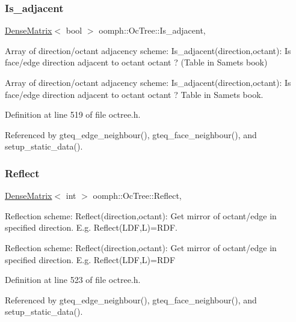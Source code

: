 \subsubsection{\texorpdfstring{Is\+\_\+adjacent}{Is\_adjacent}}
{\footnotesize\ttfamily \hyperlink{classoomph_1_1DenseMatrix}{Dense\+Matrix}$<$ bool $>$ oomph\+::\+Oc\+Tree\+::\+Is\+\_\+adjacent\hspace{0.3cm}{\ttfamily [static]}, {\ttfamily [private]}}



Array of direction/octant adjacency scheme\+: Is\+\_\+adjacent(direction,octant)\+: Is face/edge {\ttfamily direction} adjacent to octant {\ttfamily octant} ? (Table in Samet\textquotesingle{}s book) 

Array of direction/octant adjacency scheme\+: Is\+\_\+adjacent(direction,octant)\+: Is face/edge {\ttfamily direction} adjacent to octant {\ttfamily octant} ? Table in Samet\textquotesingle{}s book. 

Definition at line 519 of file octree.\+h.



Referenced by gteq\+\_\+edge\+\_\+neighbour(), gteq\+\_\+face\+\_\+neighbour(), and setup\+\_\+static\+\_\+data().

\mbox{\label{classoomph_1_1OcTree_aae2497ec31766ebf0541ff6f2bffa790}} 
\subsubsection{\texorpdfstring{Reflect}{Reflect}}
{\footnotesize\ttfamily \hyperlink{classoomph_1_1DenseMatrix}{Dense\+Matrix}$<$ int $>$ oomph\+::\+Oc\+Tree\+::\+Reflect\hspace{0.3cm}{\ttfamily [static]}, {\ttfamily [private]}}



Reflection scheme\+: Reflect(direction,octant)\+: Get mirror of octant/edge in specified direction. E.\+g. Reflect(\+L\+D\+F,\+L)=R\+DF. 

Reflection scheme\+: Reflect(direction,octant)\+: Get mirror of octant/edge in specified direction. E.\+g. Reflect(\+L\+D\+F,\+L)=R\+DF 

Definition at line 523 of file octree.\+h.



Referenced by gteq\+\_\+edge\+\_\+neighbour(), gteq\+\_\+face\+\_\+neighbour(), and setup\+\_\+static\+\_\+data().

